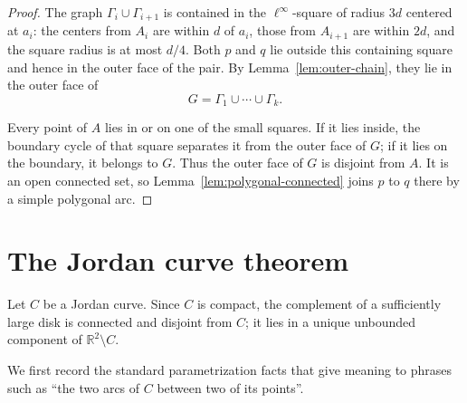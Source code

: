 \documentclass[11pt]{article}
\theoremstyle{mainplain}
\theoremstyle{mainroman}
\theoremstyle{definition}
\numberwithin{equation}{section}
\begin{document}
\begin{proof}
The graph $\Gamma_i\cup\Gamma_{i+1}$ is contained in the
$\ell^\infty$-square of radius $3d$ centered at $a_i$: the centers from
$A_i$ are within $d$ of $a_i$, those from $A_{i+1}$ are within $2d$,
and the square radius is at most $d/4$. Both $p$ and $q$ lie outside
this containing square and hence in the outer face of the pair. By
Lemma~\ref{lem:outer-chain}, they lie in the outer face of
\[
 G=\Gamma_1\cup\cdots\cup\Gamma_k.
\]

Every point of $A$ lies in or on one of the small squares. If it lies
inside, the boundary cycle of that square separates it from the outer
face of $G$; if it lies on the boundary, it belongs to $G$. Thus the
outer face of $G$ is disjoint from $A$. It is an open connected set, so
Lemma~\ref{lem:polygonal-connected} joins $p$ to $q$ there by a simple
polygonal arc.
\end{proof}

\section{The Jordan curve theorem}

Let $C$ be a Jordan curve. Since $C$ is compact, the complement of a
sufficiently large disk is connected and disjoint from $C$; it lies in
a unique unbounded component of $\mathbb R^2\setminus C$.

We first record the standard parametrization facts that give meaning
to phrases such as ``the two arcs of $C$ between two of its points''.
\end{document}
